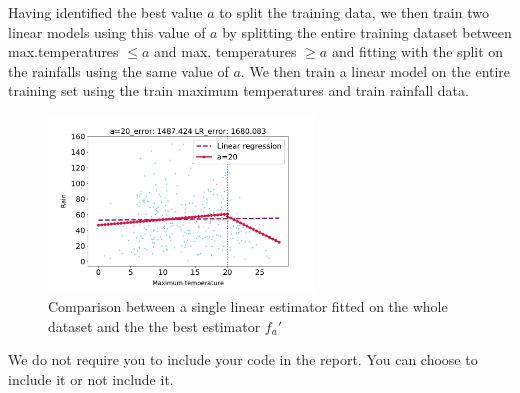 \documentclass[12pt,twoside]{article}
\begin{document}
\begin{enumerate}
\begin{enumerate}
 	Having identified the best value $a$ to split the training data, we then train two linear models using this value of $a$ by splitting the entire training dataset between
	max.temperatures $\le a$ and max. temperatures $\ge a$ and fitting with the split on the rainfalls using the same value of $a$.
	We then train a linear model on the entire training set using the train maximum temperatures and train rainfall data.
	
 
 	\begin{figure}[H]
		\centering
		\includegraphics[width=200pt]{figures/test_comparison.pdf}
		\caption{Comparison between a single linear estimator fitted on the whole dataset and the  the best estimator $f_a'$}
		\label{fig6}
	\end{figure}


 \end{enumerate}
 	
 We do not require you to include your code in the report. You can choose to include it or not include it. 
\end{enumerate}
\end{document}
